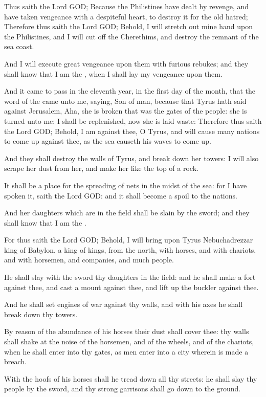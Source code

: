 \Verse Thus saith the Lord GOD; Because the Philistines have dealt by revenge, and have taken vengeance with a despiteful heart, to destroy it for the old hatred; \Verse Therefore thus saith the Lord GOD; Behold, I will stretch out mine hand upon the Philistines, and I will cut off the Cherethims, and destroy the remnant of the sea coast.

\Verse And I will execute great vengeance upon them with furious rebukes; and they shall know that I am the \LORD, when I shall lay my vengeance upon them.


\Chapter
\Verse And it came to pass in the eleventh year, in the first day of the month, that the word of the \LORD came unto me, saying, \Verse Son of man, because that Tyrus hath said against Jerusalem, Aha, she is broken that was the gates of the people: she is turned unto me: I shall be replenished, now she is laid waste: \Verse Therefore thus saith the Lord GOD; Behold, I am against thee, O Tyrus, and will cause many nations to come up against thee, as the sea causeth his waves to come up.

\Verse And they shall destroy the walls of Tyrus, and break down her towers: I will also scrape her dust from her, and make her like the top of a rock.

\Verse It shall be a place for the spreading of nets in the midst of the sea: for I have spoken it, saith the Lord GOD: and it shall become a spoil to the nations.

\Verse And her daughters which are in the field shall be slain by the sword; and they shall know that I am the \LORD.

\Verse For thus saith the Lord GOD; Behold, I will bring upon Tyrus Nebuchadrezzar king of Babylon, a king of kings, from the north, with horses, and with chariots, and with horsemen, and companies, and much people.

\Verse He shall slay with the sword thy daughters in the field: and he shall make a fort against thee, and cast a mount against thee, and lift up the buckler against thee.

\Verse And he shall set engines of war against thy walls, and with his axes he shall break down thy towers.

\Verse By reason of the abundance of his horses their dust shall cover thee: thy walls shall shake at the noise of the horsemen, and of the wheels, and of the chariots, when he shall enter into thy gates, as men enter into a city wherein is made a breach.

\Verse With the hoofs of his horses shall he tread down all thy streets: he shall slay thy people by the sword, and thy strong garrisons shall go down to the ground.


